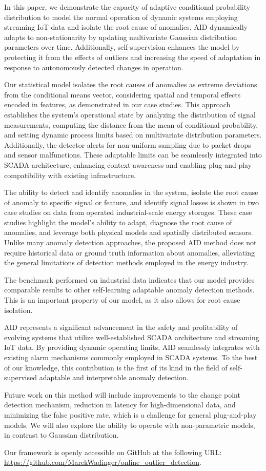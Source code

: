 In this paper, we demonstrate the capacity of adaptive conditional probability distribution to model the normal operation of dynamic systems employing streaming IoT data and isolate the root cause of anomalies. AID dynamically adapts to non-stationarity by updating multivariate Gaussian distribution parameters over time. Additionally, self-supervision enhances the model by protecting it from the effects of outliers and increasing the speed of adaptation in response to autonomously detected changes in operation.

Our statistical model isolates the root causes of anomalies as extreme deviations from the conditional means vector, considering spatial and temporal effects encoded in features, as demonstrated in our case studies. This approach establishes the system's operational state by analyzing the distribution of signal measurements, computing the distance from the mean of conditional probability, and setting dynamic process limits based on multivariate distribution parameters. Additionally, the detector alerts for non-uniform sampling due to packet drops and sensor malfunctions. These adaptable limits can be seamlessly integrated into SCADA architecture, enhancing context awareness and enabling plug-and-play compatibility with existing infrastructure.

The ability to detect and identify anomalies in the system, isolate the root cause of anomaly to specific signal or feature, and identify signal losses is shown in two case studies on data from operated industrial-scale energy storages. These case studies highlight the model's ability to adapt, diagnose the root cause of anomalies, and leverage both physical models and spatially distributed sensors. Unlike many anomaly detection approaches, the proposed AID method does not require historical data or ground truth information about anomalies, alleviating the general limitations of detection methods employed in the energy industry.

The benchmark performed on industrial data indicates that our model provides comparable results to other self-learning adaptable anomaly detection methods. This is an important property of our model, as it also allows for root cause isolation.

AID represents a significant advancement in the safety and profitability of evolving systems that utilize well-established SCADA architecture and streaming IoT data. By providing dynamic operating limits, AID seamlessly integrates with existing alarm mechanisms commonly employed in SCADA systems. To the best of our knowledge, this contribution is the first of its kind in the field of self-supervised adaptable and interpretable anomaly detection.

Future work on this method will include improvements to the change point detection mechanism, reduction in latency for high-dimensional data, and minimizing the false positive rate, which is a challenge for general plug-and-play models. We will also explore the ability to operate with non-parametric models, in contrast to Gaussian distribution.

Our framework is openly accessible on GitHub at the following URL: \url{https://github.com/MarekWadinger/online_outlier_detection}.

